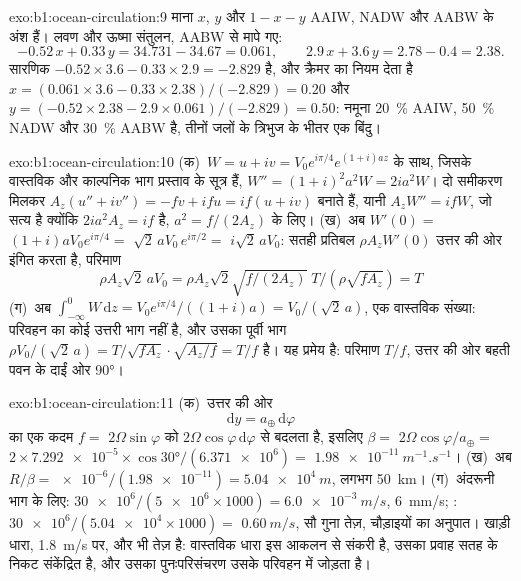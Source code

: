 \begin{solution}{exo:b1:ocean-circulation:9}
माना $x$, $y$ और $1 - x - y$ AAIW, NADW और AABW के अंश हैं। लवण और ऊष्मा संतुलन, AABW से मापे गए:
\[
  -0.52\,x + 0.33\,y = 34.731 - 34.67 = 0.061,\qquad
  2.9\,x + 3.6\,y = 2.78 - 0.4 = 2.38 .
\]
सारणिक $-0.52 \times 3.6 - 0.33 \times 2.9 = -2.829$ है, और क्रैमर का नियम
देता है $x = (0.061 \times 3.6 - 0.33 \times 2.38)/(-2.829) = 0.20$ और $y = (-0.52
\times 2.38 - 2.9 \times 0.061)/(-2.829) = 0.50$: नमूना \qty{20}{\percent} AAIW, \qty{50}{\percent} NADW और \qty{30}{\percent} AABW है, तीनों जलों के त्रिभुज के भीतर एक बिंदु।
\end{solution}

\begin{solution}{exo:b1:ocean-circulation:10}
(क)~$W = u + iv = V_0e^{i\pi/4}e^{(1+i)az}$ के साथ, जिसके वास्तविक और काल्पनिक भाग
प्रस्ताव के सूत्र हैं, $W'' = (1+i)^2a^2W = 2ia^2W$। दो समीकरण
मिलकर $A_z(u'' + iv'') = -fv + ifu = if(u + iv)$ बनाते हैं, यानी $A_zW'' = ifW$, जो सत्य है क्योंकि $2ia^2A_z = if$ है, $a^2 = f/(2A_z)$ के लिए। (ख)~अब $W'(0) =$
$(1+i)aV_0e^{i\pi/4} =$ $\sqrt2\,aV_0\,e^{i\pi/2} =$ $i\sqrt2\,aV_0$: सतही प्रतिबल $\rho A_zW'(0)$ उत्तर की ओर इंगित करता है, परिमाण
\[ \rho A_z\sqrt2\,aV_0 = \rho A_z\sqrt2\sqrt{f/(2A_z)}\;T/(\rho\sqrt{fA_z}) = T \]
(ग)~अब $\int_{-\infty}^0 W\,\mathrm dz =
V_0e^{i\pi/4}/((1+i)a) = V_0/(\sqrt2\,a)$, एक वास्तविक संख्या: परिवहन का कोई उत्तरी भाग नहीं है, और उसका पूर्वी भाग $\rho V_0/(\sqrt2\,a) =
T/\sqrt{fA_z}\cdot\sqrt{A_z/f} = T/f$ है। यह प्रमेय है: परिमाण $T/f$, उत्तर की ओर बहती पवन के दाईं ओर \ang{90}।
\end{solution}

\begin{solution}{exo:b1:ocean-circulation:11}
(क)~उत्तर की ओर
\[ \mathrm dy = a_\oplus\,\mathrm d\varphi \]
का एक कदम $f =$ $2\Omega\sin\varphi$ को $2\Omega\cos\varphi\,\mathrm d\varphi$ से बदलता है, इसलिए $\beta =$ $2\Omega\cos\varphi/a_\oplus =$ $2 \times \num{7.292e-5} \times \cos\ang{30}/(\num{6.371e6}) =$
$\qty{1.98e-11}{m^{-1}.s^{-1}}$। (ख)~अब $R/\beta = \num{e-6}/(\num{1.98e-11}) =
\qty{5.04e4}{m}$, लगभग \qty{50}{km}। (ग)~अंदरूनी भाग के लिए: $\num{30e6}/(\num{5e6} \times
1000) = \qty{6.0e-3}{m/s}$, \qty{6}{mm/s}; : $\num{30e6}/(\num{5.04e4} \times 1000) =$ $\qty{0.60}{m/s}$, सौ गुना तेज़, चौड़ाइयों का अनुपात। खाड़ी धारा, \qty{1.8}{m/s} पर, और भी तेज़ है: वास्तविक धारा इस आकलन से संकरी है, उसका प्रवाह सतह के निकट संकेंद्रित है, और उसका पुनःपरिसंचरण उसके परिवहन में जोड़ता है।
\end{solution}

